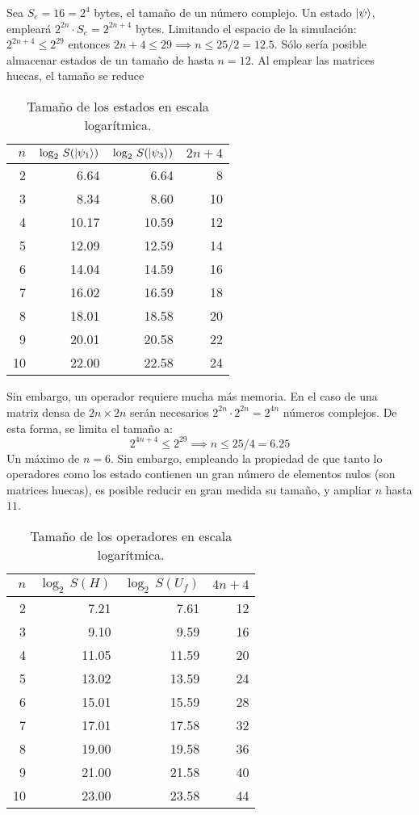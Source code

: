 \begin{ejemplo}
Sea $S_e = 16 = 2^4$ bytes, el tamaño de un número complejo. Un estado 
$\ket{\psi}$, empleará $2^{2n}\cdot S_e = 2^{2n+4}$ bytes. Limitando el espacio 
de la simulación: $2^{2n+4} \leq 2^{29}$ entonces $2n+4 \leq 29 \implies n \leq 
25/2 = 12.5$. Sólo sería posible almacenar estados de un tamaño de hasta $n=12$.
Al emplear las matrices huecas, el tamaño se reduce

\begin{table}[h]
	\centering
	\begin{tabular}{*{4}{r}}
		\toprule
		$n$ & $\log_2 \, S(\ket{\psi_1})$ & $\log_2 \, S(\ket{\psi_3})$ & $2n+4$ \\
		\midrule
		2 	& 6.64	& 6.64	& 8\\
		3 	& 8.34	& 8.60	& 10\\
		4 	& 10.17	& 10.59	& 12\\
		5 	& 12.09	& 12.59	& 14\\
		6 	& 14.04	& 14.59	& 16\\
		7 	& 16.02	& 16.59	& 18\\
		8 	& 18.01	& 18.58	& 20\\
		9 	& 20.01	& 20.58	& 22\\
		10 	& 22.00	& 22.58	& 24\\
		\bottomrule
	\end{tabular}
	\caption{Tamaño de los estados en escala logarítmica.}
\end{table}

Sin embargo, un operador requiere mucha más memoria. En el caso de una matriz 
densa de $2n \times 2n$ serán necesarios $2^{2n} \cdot 2^{2n} = 2^{4n}$ números 
complejos. De esta forma, se limita el tamaño a:
$$2^{4n+4} \leq 2^{29} \implies n \leq 25/4 = 6.25 $$
Un máximo de $n = 6$. Sin embargo, empleando la propiedad de que tanto lo 
operadores como los estado contienen un gran número de elementos nulos (son 
matrices huecas), es posible reducir en gran medida su tamaño, y ampliar $n$ 
hasta $11$.

\begin{table}[h]
	\centering
	\begin{tabular}{*{4}{r}}
		\toprule
		$n$ & $\log_2 \, S(H)$ & $\log_2 \, S(U_f)$ & $4n+4$ \\
		\midrule
		2 	& 7.21	& 7.61	& 12\\
		3 	& 9.10	& 9.59	& 16\\
		4 	& 11.05	& 11.59	& 20\\
		5 	& 13.02	& 13.59	& 24\\
		6 	& 15.01	& 15.59	& 28\\
		7 	& 17.01	& 17.58	& 32\\
		8 	& 19.00	& 19.58	& 36\\
		9 	& 21.00	& 21.58	& 40\\
		10 	& 23.00	& 23.58	& 44\\
		\bottomrule
	\end{tabular}
	\caption{Tamaño de los operadores en escala logarítmica.}
\end{table}




\end{ejemplo}

